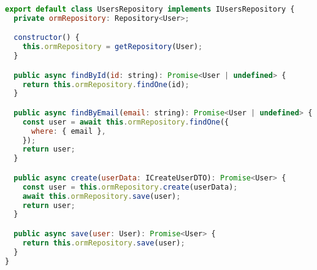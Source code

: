 \begin{lstlisting}[language=JavaScript, caption={Implementação para uso em produção},captionpos=b, label=alg:usersrepository]
export default class UsersRepository implements IUsersRepository {
  private ormRepository: Repository<User>;

  constructor() {
    this.ormRepository = getRepository(User);
  }

  public async findById(id: string): Promise<User | undefined> {
    return this.ormRepository.findOne(id);
  }

  public async findByEmail(email: string): Promise<User | undefined> {
    const user = await this.ormRepository.findOne({
      where: { email },
    });
    return user;
  }

  public async create(userData: ICreateUserDTO): Promise<User> {
    const user = this.ormRepository.create(userData);
    await this.ormRepository.save(user);
    return user;
  }

  public async save(user: User): Promise<User> {
    return this.ormRepository.save(user);
  }
}
\end{lstlisting}